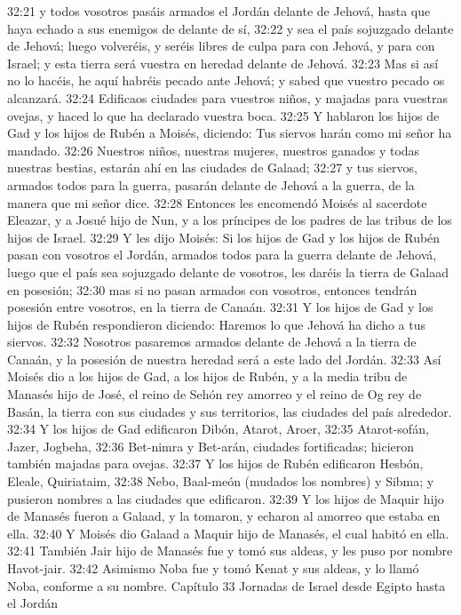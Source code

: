 32:21 y todos vosotros pasáis armados el Jordán delante de Jehová, hasta que haya echado a sus enemigos de delante de sí,  
32:22 y sea el país sojuzgado delante de Jehová; luego volveréis, y seréis libres de culpa para con Jehová, y para con Israel; y esta tierra será vuestra en heredad delante de Jehová.  
32:23 Mas si así no lo hacéis, he aquí habréis pecado ante Jehová; y sabed que vuestro pecado os alcanzará.  
32:24 Edificaos ciudades para vuestros niños, y majadas para vuestras ovejas, y haced lo que ha declarado vuestra boca.  
32:25 Y hablaron los hijos de Gad y los hijos de Rubén a Moisés, diciendo: Tus siervos harán como mi señor ha mandado.  
32:26 Nuestros niños, nuestras mujeres, nuestros ganados y todas nuestras bestias, estarán ahí en las ciudades de Galaad;  
32:27 y tus siervos, armados todos para la guerra, pasarán delante de Jehová a la guerra, de la manera que mi señor dice.  
32:28 Entonces les encomendó Moisés al sacerdote Eleazar, y a Josué hijo de Nun, y a los príncipes de los padres de las tribus de los hijos de Israel.  
32:29 Y les dijo Moisés: Si los hijos de Gad y los hijos de Rubén pasan con vosotros el Jordán, armados todos para la guerra delante de Jehová, luego que el país sea sojuzgado delante de vosotros, les daréis la tierra de Galaad en posesión;  
32:30 mas si no pasan armados con vosotros, entonces tendrán posesión entre vosotros, en la tierra de Canaán.  
32:31 Y los hijos de Gad y los hijos de Rubén respondieron diciendo: Haremos lo que Jehová ha dicho a tus siervos.  
32:32 Nosotros pasaremos armados delante de Jehová a la tierra de Canaán, y la posesión de nuestra heredad será a este lado del Jordán.  
32:33 Así Moisés dio a los hijos de Gad, a los hijos de Rubén, y a la media tribu de Manasés hijo de José, el reino de Sehón rey amorreo y el reino de Og rey de Basán, la tierra con sus ciudades y sus territorios, las ciudades del país alrededor. 
32:34 Y los hijos de Gad edificaron Dibón, Atarot, Aroer,  
32:35 Atarot-sofán, Jazer, Jogbeha,  
32:36 Bet-nimra y Bet-arán, ciudades fortificadas; hicieron también majadas para ovejas.  
32:37 Y los hijos de Rubén edificaron Hesbón, Eleale, Quiriataim,  
32:38 Nebo, Baal-meón (mudados los nombres) y Sibma; y pusieron nombres a las ciudades que edificaron.  
32:39 Y los hijos de Maquir hijo de Manasés fueron a Galaad, y la tomaron, y echaron al amorreo que estaba en ella.  
32:40 Y Moisés dio Galaad a Maquir hijo de Manasés, el cual habitó en ella.  
32:41 También Jair hijo de Manasés fue y tomó sus aldeas, y les puso por nombre Havot-jair.  
32:42 Asimismo Noba fue y tomó Kenat y sus aldeas, y lo llamó Noba, conforme a su nombre.  
Capítulo 33
Jornadas de Israel desde Egipto hasta el Jordán  

